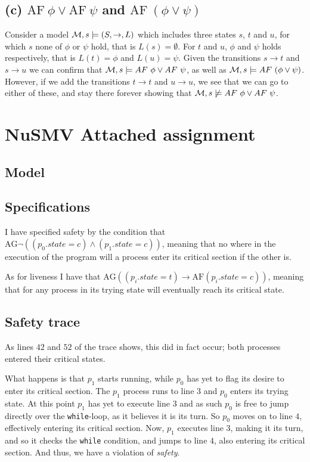 \documentclass[11pt,a4paper]{article}
\let\imp\to
\begin{document}
\subsection*{(c) \mdseries $\text{AF}{\ }\phi \lor \text{AF}{\ }\psi$ and
$\text{AF}{\ }(\phi \lor \psi)$}
Consider a model ${\cal M}, s \models (S,\imp,L)$ which includes three states
$s$, $t$ and $u$, for which $s$ none of $\phi$ or $\psi$ hold, that is $L(s)
= \emptyset$. For $t$ and $u$, $\phi$ and $\psi$ holds respectively, that is
$L(t) = \phi$ and $L(u) = \psi$. Given the transitions $s \imp t$ and $s \imp
u$ we can confirm that ${\cal M}, s \models AF{\ }\phi \lor AF{\ }\psi$, as
well as ${\cal M}, s \models AF{\ }(\phi \lor \psi)$. However, if we add the
transitions $t \imp t$ and $u \imp u$, we see that we can go to either of
these, and stay there forever showing that
${\cal M}, s \not\models AF{\ }\phi \lor AF{\ }\psi$.

\newpage
\section*{NuSMV \mdseries Attached assignment}
\subsection*{Model}


\subsection*{Specifications}
I have specified safety by the condition that $\text{AG} \neg( (p_0.state = c)
\land (p_1.state = c) )$, meaning that no where in the execution of the program
will a process enter its critical section if the other is.

As for liveness I have that $\text{AG} ( (p_i.state = t) \imp \text{AF}
(p_i.state = c) )$, meaning that for any process in its trying state will
eventually reach its critical state.

\newpage
\subsection*{Safety trace}

As lines $42$ and $52$ of the trace shows, this did in fact occur; both
processes entered their critical states.

What happens is that $p_1$ starts running, while $p_0$ has yet to flag its
desire to enter its critical section. The $p_1$ process runs to line $3$ and
$p_0$ enters its trying state. At this point $p_1$ has yet to execute line $3$
and as such $p_0$ is free to jump directly over the {\tt while}-loop, as it
believes it is its turn. So $p_0$ moves on to line $4$, effectively entering
its critical section. Now, $p_1$ executes line $3$, making it its turn, and so
it checks the {\tt while} condition, and jumps to line $4$, also entering its
critical section. And thus, we have a violation of {\it safety}.
\end{document}

